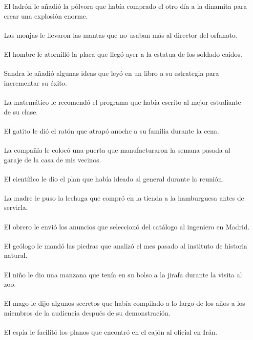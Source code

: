 El ladr\'{o}n le a\~{n}adi\'{o} la p\'{o}lvora que hab\'{i}a comprado el otro d\'{i}a a la dinamita para crear una explosi\'{o}n enorme.	\\	\\
Las monjas le llevaron las mantas que no usaban m\'{a}s al director del orfanato.	\\	\\
El hombre le atornill\'{o} la placa que lleg\'{o} ayer a la estatua de los soldado caidos.	\\	\\
Sandra le a\~{n}adi\'{o} algunas ideas que ley\'{o} en un libro a su estrategia para incrementar su éxito.	\\	\\
La matem\'{a}tico le recomend\'{o} el programa que hab\'{i}a escrito al mejor estudiante de su clase.	\\	\\
El gatito le di\'{o} el rat\'{o}n que atrap\'{o} anoche a su familia durante la cena.	\\	\\
La compa\~{n}\'{i}a le coloc\'{o} una puerta que manufacturaron la semana pasada al garaje de la casa de mis vecinos.	\\	\\
El cient\'{i}fico le dio el plan que hab\'{i}a ideado al general durante la reuni\'{o}n.	\\	\\
La madre le puso la lechuga que compr\'{o} en la tienda a la hamburguesa antes de servirla.	\\	\\
El obrero le envi\'{o} los anuncios que seleccion\'{o} del cat\'{a}logo al ingeniero en Madrid.	\\	\\
El ge\'{o}logo le mand\'{o} las piedras que analiz\'{o} el mes pasado al instituto de historia natural.	\\	\\
El ni\~{n}o le dio una manzana que ten\'{i}a en su bolso a la jirafa durante la visita al zoo.	\\	\\
El mago le dijo algunos secretos que hab\'{i}a compilado a lo largo de los a\~{n}os a los miembros de la audiencia después de su demonstraci\'{o}n.	\\	\\
El esp\'{i}a le facilit\'{o} los planos que encontr\'{o} en el caj\'{o}n al oficial en Ir\'{a}n.	\\	\\
